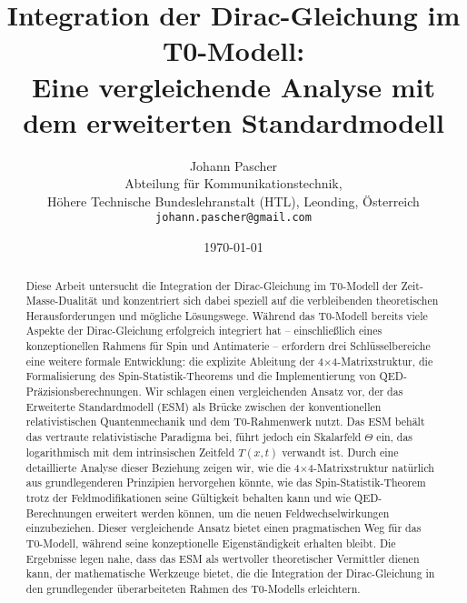 \documentclass[12pt,a4paper]{article}
\begin{document}
	
	\title{Integration der Dirac-Gleichung im T0-Modell: \\Eine vergleichende Analyse mit dem erweiterten Standardmodell}
	\author{Johann Pascher\\
		Abteilung für Kommunikationstechnik, \\Höhere Technische Bundeslehranstalt (HTL), Leonding, Österreich\\
		\texttt{johann.pascher@gmail.com}}
	\date{\today}
	
	\maketitle
	
	\begin{abstract}
		Diese Arbeit untersucht die Integration der Dirac-Gleichung im T0-Modell der Zeit-Masse-Dualität und konzentriert sich dabei speziell auf die verbleibenden theoretischen Herausforderungen und mögliche Lösungswege. Während das T0-Modell bereits viele Aspekte der Dirac-Gleichung erfolgreich integriert hat – einschließlich eines konzeptionellen Rahmens für Spin und Antimaterie – erfordern drei Schlüsselbereiche eine weitere formale Entwicklung: die explizite Ableitung der 4$\times$4-Matrixstruktur, die Formalisierung des Spin-Statistik-Theorems und die Implementierung von QED-Präzisionsberechnungen. Wir schlagen einen vergleichenden Ansatz vor, der das Erweiterte Standardmodell (ESM) als Brücke zwischen der konventionellen relativistischen Quantenmechanik und dem T0-Rahmenwerk nutzt. Das ESM behält das vertraute relativistische Paradigma bei, führt jedoch ein Skalarfeld $\Theta$ ein, das logarithmisch mit dem intrinsischen Zeitfeld $T(x,t)$ verwandt ist. Durch eine detaillierte Analyse dieser Beziehung zeigen wir, wie die 4$\times$4-Matrixstruktur natürlich aus grundlegenderen Prinzipien hervorgehen könnte, wie das Spin-Statistik-Theorem trotz der Feldmodifikationen seine Gültigkeit behalten kann und wie QED-Berechnungen erweitert werden können, um die neuen Feldwechselwirkungen einzubeziehen. Dieser vergleichende Ansatz bietet einen pragmatischen Weg für das T0-Modell, während seine konzeptionelle Eigenständigkeit erhalten bleibt. Die Ergebnisse legen nahe, dass das ESM als wertvoller theoretischer Vermittler dienen kann, der mathematische Werkzeuge bietet, die die Integration der Dirac-Gleichung in den grundlegender überarbeiteten Rahmen des T0-Modells erleichtern.
	\end{abstract}
	\newpage
	\tableofcontents
	\newpage
	
\end{document}
